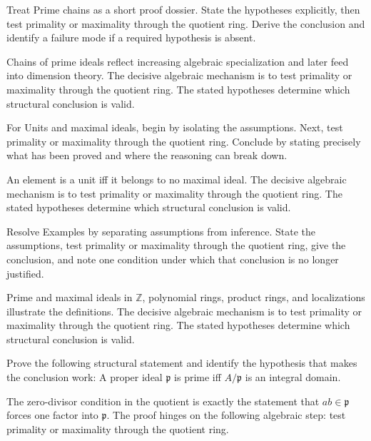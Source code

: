 \begin{problem}\label{prob:v02-problem-06}
Treat Prime chains as a short proof dossier. State the hypotheses explicitly, then test primality or maximality through the quotient ring. Derive the conclusion and identify a failure mode if a required hypothesis is absent.
\end{problem}
\begin{solution}
Chains of prime ideals reflect increasing algebraic specialization and later feed into dimension theory. The decisive algebraic mechanism is to test primality or maximality through the quotient ring. The stated hypotheses determine which structural conclusion is valid.
\end{solution}

\begin{problem}\label{prob:v02-problem-07}
For Units and maximal ideals, begin by isolating the assumptions. Next, test primality or maximality through the quotient ring. Conclude by stating precisely what has been proved and where the reasoning can break down.
\end{problem}
\begin{solution}
An element is a unit iff it belongs to no maximal ideal. The decisive algebraic mechanism is to test primality or maximality through the quotient ring. The stated hypotheses determine which structural conclusion is valid.
\end{solution}

\begin{problem}\label{prob:v02-problem-08}
Resolve Examples by separating assumptions from inference. State the assumptions, test primality or maximality through the quotient ring, give the conclusion, and note one condition under which that conclusion is no longer justified.
\end{problem}
\begin{solution}
Prime and maximal ideals in $\mathbb Z$, polynomial rings, product rings, and localizations illustrate the definitions. The decisive algebraic mechanism is to test primality or maximality through the quotient ring. The stated hypotheses determine which structural conclusion is valid.
\end{solution}

\begin{problem}\label{prob:v02-problem-09}
Prove the following structural statement and identify the hypothesis that makes the conclusion work: A proper ideal $\mathfrak p$ is prime iff $A/\mathfrak p$ is an integral domain.
\end{problem}
\begin{solution}
The zero-divisor condition in the quotient is exactly the statement that $ab\in\mathfrak p$ forces one factor into $\mathfrak p$. The proof hinges on the following algebraic step: test primality or maximality through the quotient ring.
\end{solution}

